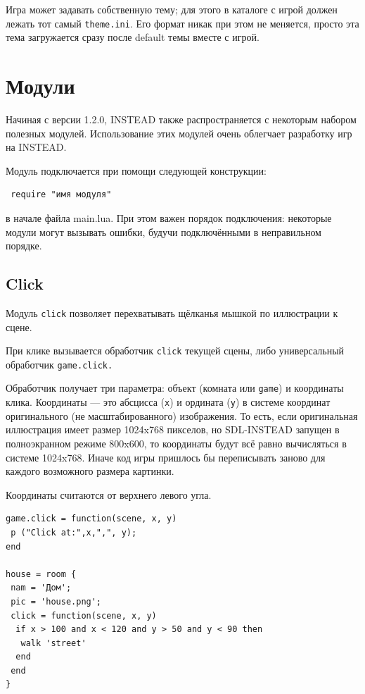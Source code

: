 \documentclass[12pt]{article}
\begin{document}
Игра может задавать собственную тему; для этого в каталоге с игрой должен лежать тот самый \verb/theme.ini/. Его формат никак при этом не меняется, просто эта тема загружается сразу после default темы вместе с игрой.

\section{Модули}

Начиная с версии 1.2.0, INSTEAD также распространяется с некоторым набором полезных модулей. Использование этих модулей очень облегчает разработку игр на INSTEAD.

Модуль подключается при помощи следующей конструкции:

\begin{verbatim}
 require "имя модуля"
\end{verbatim}

в начале файла main.lua. При этом важен порядок подключения: некоторые модули могут вызывать ошибки, будучи подключёнными в неправильном порядке.

\subsection{Click}

Модуль \verb/click/ позволяет перехватывать щёлканья мышкой по иллюстрации к сцене.

При клике вызывается обработчик \verb/click/ текущей сцены, либо универсальный обработчик \verb/game.click./

Обработчик получает три параметра: объект (комната или \verb/game/) и координаты клика. Координаты — это абсцисса (\verb/x/) и ордината (\verb/y/) в системе координат оригинального (не масштабированного) изображения. То есть, если оригинальная иллюстрация имеет размер 1024x768 пикселов, но SDL-INSTEAD запущен в полноэкранном режиме 800x600, то координаты будут всё равно вычисляться в системе 1024x768. Иначе код игры пришлось бы переписывать заново для каждого возможного размера картинки.

Координаты считаются от верхнего левого угла.

\begin{verbatim}
game.click = function(scene, x, y)
 p ("Click at:",x,",", y);
end

house = room {
 nam = 'Дом';
 pic = 'house.png';
 click = function(scene, x, y)
  if x > 100 and x < 120 and y > 50 and y < 90 then
   walk 'street'
  end
 end
}
\end{verbatim}
\end{document}
